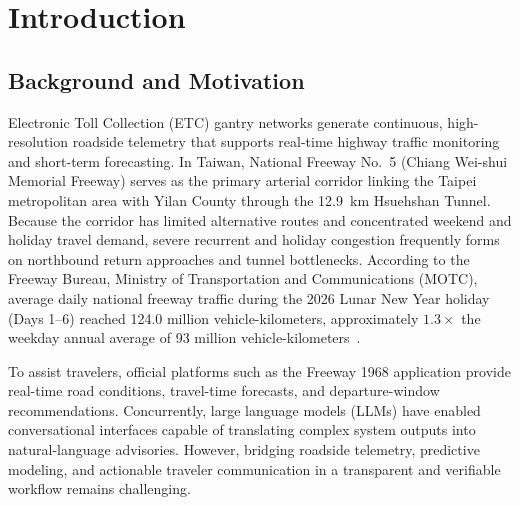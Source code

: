 \section{Introduction}\label{sec:intro}

\subsection{Background and Motivation}
Electronic Toll Collection (ETC) gantry networks generate continuous, high-resolution roadside telemetry that supports real-time highway traffic monitoring and short-term forecasting. In Taiwan, National Freeway No.~5 (Chiang Wei-shui Memorial Freeway) serves as the primary arterial corridor linking the Taipei metropolitan area with Yilan County through the 12.9~km Hsuehshan Tunnel. Because the corridor has limited alternative routes and concentrated weekend and holiday travel demand, severe recurrent and holiday congestion frequently forms on northbound return approaches and tunnel bottlenecks. According to the Freeway Bureau, Ministry of Transportation and Communications (MOTC), average daily national freeway traffic during the 2026 Lunar New Year holiday (Days 1--6) reached 124.0 million vehicle-kilometers, approximately $1.3\times$ the weekday annual average of 93 million vehicle-kilometers~\cite{freeway2026cny}.

To assist travelers, official platforms such as the Freeway 1968 application provide real-time road conditions, travel-time forecasts, and departure-window recommendations. Concurrently, large language models (LLMs) have enabled conversational interfaces capable of translating complex system outputs into natural-language advisories. However, bridging roadside telemetry, predictive modeling, and actionable traveler communication in a transparent and verifiable workflow remains challenging.

